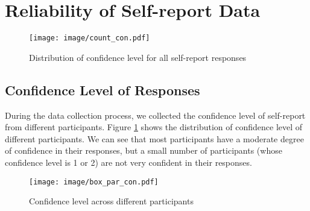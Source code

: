 \documentclass[sigconf]{acmart}
\begin{document}

\section{Reliability of Self-report Data}
\label{sec:reliability}


\begin{figure}
    \centering
    \texttt{[image: image/count\_con.pdf]}
    \caption{Distribution of confidence level for all self-report responses}
    \label{fig:dis_con}
\end{figure}

\subsection{Confidence Level of Responses}

During the data collection process, we collected the confidence level of self-report from different participants.
Figure \ref{fig:dis_con} shows the distribution of confidence level of different participants. We can see that most participants have a moderate degree of confidence in their responses, but a small number of participants (whose confidence level is 1 or 2) are not very confident in their responses. 



\begin{figure}
    \centering
    \texttt{[image: image/box\_par\_con.pdf]}
    \caption{Confidence level across different participants}
    \label{fig:box_confi}
\end{figure}
\end{document}
